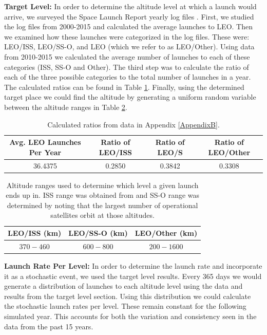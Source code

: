 \documentclass[pre,12pt]{revtex4-1}
\begin{document}
\textbf{Target Level: }In order to determine the altitude level at which a launch would arrive, we surveyed the Space Launch Report yearly log files \cite{spaceLaunchReport}. First, we studied the log files from 2000-2015 and calculated the average launches to LEO. Then we examined how these launches were categorized in the log files. These were: LEO/ISS, LEO/SS-O, and LEO (which we refer to as LEO/Other). Using data from 2010-2015 we calculated the average number of launches to each of these categories (ISS, SS-O and Other). The third step was to calculate the ratio of each of the three possible categories to the total number of launches in a year. The calculated ratios can be found in Table \ref{launchRatios}.  Finally, using the determined target place we could find the altitude by generating a uniform random variable between the altitude ranges in Table \ref{altitudeRanges}.  \\
\begin{table}[h]
\centering
    \begin{tabular}{| c | c | c | c |}     
    \hline
    \textbf{Avg. LEO Launches Per Year} & \textbf{Ratio of LEO/ISS} & \textbf{Ratio of LEO/S}  & \textbf{Ratio of LEO/Other}\\ \hline
    36.4375 & 0.2850 & 0.3842 & 0.3308\\ \hline
	\end{tabular}
\caption{Calculated ratios from data in Appendix \ref{AppendixB}.}
\label{launchRatios}
\end{table}

\begin{table}[h]
\centering
    \begin{tabular}{| c | c | c |}     
    \hline
    \textbf{LEO/ISS (km)} & \textbf{LEO/SS-O (km)} & \textbf{LEO/Other (km)} \\ \hline
    $370-460$ & $600-800$ & $200-1600$ \\ \hline
	\end{tabular}
\caption{Altitude ranges used to determine which level a given launch ends up in. ISS range was obtained from \cite{esaISS} and SS-O range was determined by noting that the largest number of operational satellites orbit at those altitudes.}
\label{altitudeRanges}
\end{table}

\textbf{Launch Rate Per Level: } In order to determine the launch rate and incorporate it as a stochastic event, we used the target level results. Every 365 days we would generate a distribution of launches to each altitude level using the data and results from the target level section. Using this distribution we could calculate the stochastic launch rates per level. These remain constant for the following simulated year. This accounts for both the variation and consistency seen in the data from the past 15 years. \\
\end{document}
